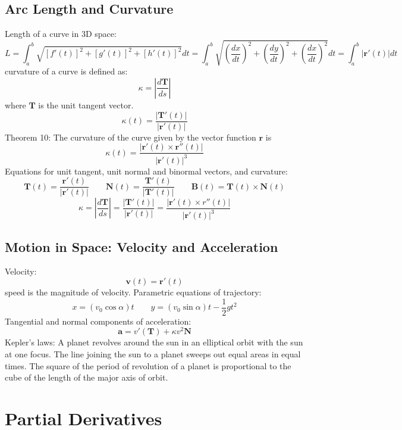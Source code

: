 \documentclass{article}
\begin{document}
    \subsection{Arc Length and Curvature}
    \begin{outline}
        \1 Length of a curve in 3D space: \[L=\int^b_a\sqrt{[f'(t)]^2+[g'(t)]^2+[h'(t)]^2}dt=\int^b_a\sqrt{\left(\dfrac{dx}{dt}\right)^2+\left(\dfrac{dy}{dt}\right)^2+\left(\dfrac{dx}{dt}\right)^2}dt=\int^b_a|\mathbf r'(t)|dt\]
        \1 curvature of a curve is defined as: \[\kappa=\left|\dfrac{d\mathbf T}{ds}\right|\] where $\mathbf T$ is the unit tangent vector. 
        \1 \[\kappa(t)=\dfrac{|\mathbf T'(t)|}{|\mathbf r'(t)|}\]
        \1 Theorem 10: The curvature of the curve given by the vector function $\mathbf r$ is \[\kappa(t)=\dfrac{|\mathbf r'(t)\times\mathbf r''(t)|}{|\mathbf r'(t)|^3}\]
        \1 Equations for unit tangent, unit normal and binormal vectors, and curvature: \[\mathbf T(t)=\dfrac{\mathbf r'(t)}{|\mathbf r'(t)|}\qquad \mathbf N(t)=\dfrac{\mathbf T'(t)}{|\mathbf T'(t)|}\qquad \mathbf B(t)=\mathbf T(t)\times\mathbf N(t)\]\[\kappa=\left|\dfrac{d\mathbf T}{ds}\right|=\dfrac{|\mathbf T'(t)|}{|\mathbf r'(t)|}=\dfrac{|\mathbf r'(t)\times r''(t)|}{|\mathbf r'(t)|^3}\]

    \end{outline}
    
    \subsection{Motion in Space: Velocity and Acceleration}
    \begin{outline}
        \1 Velocity: \[\mathbf v(t)=\mathbf r'(t)\]
        \1 speed is the magnitude of velocity. 
        \1 Parametric equations of trajectory: \[x=(v_0\cos\alpha)t\qquad y=(v_0\sin\alpha)t-\frac{1}{2}gt^2\]
        \1 Tangential and normal components of acceleration: \[\mathbf a=v'(\mathbf T)+\kappa v^2\mathbf N\]
        \1 Kepler's laws: 
            \2 A planet revolves around the sun in an elliptical orbit with the sun at one focus. 
            \2 The line joining the sun to a planet sweeps out equal areas in equal times. 
            \2 The square of the period of revolution of a planet is proportional to the cube of the length of the major axis of orbit. 
    \end{outline}

    \section{Partial Derivatives} %
\end{document}

